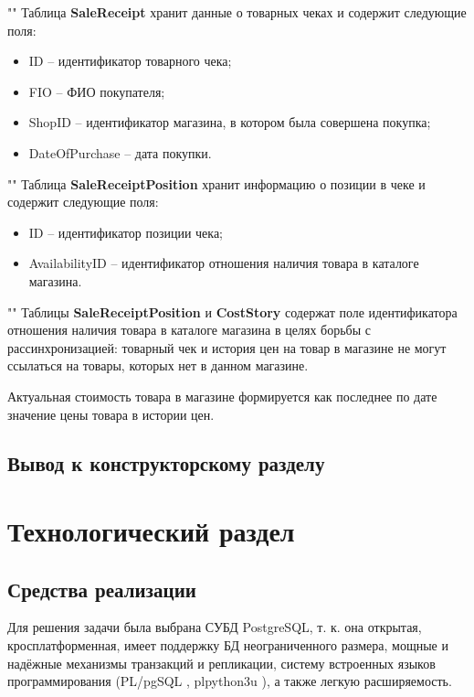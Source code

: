 \documentclass[a4paper,14pt]{extreport}
\begin{document}
""\newline\indent
Таблица \textbf{SaleReceipt} хранит данные о товарных чеках и содержит следующие поля:
\begin{itemize}
	\setlength\itemsep{0.01em}
	\item ID -- идентификатор товарного чека;
	\item FIO -- ФИО покупателя;
	\item ShopID -- идентификатор магазина, в котором была совершена покупка;
	\item DateOfPurchase -- дата покупки.
\end{itemize}

""\newline\indent
Таблица \textbf{SaleReceiptPosition} хранит информацию о позиции в чеке и содержит следующие поля:
\begin{itemize}
	\setlength\itemsep{0.01em}
	\item ID -- идентификатор позиции чека;
	\item AvailabilityID -- идентификатор отношения наличия товара в каталоге магазина.
\end{itemize}

""\newline\indent
Таблицы \textbf{SaleReceiptPosition} и \textbf{CostStory} содержат поле идентификатора отношения наличия товара в каталоге магазина в целях борьбы с рассинхронизацией: товарный чек и история цен на товар в магазине не могут ссылаться на товары, которых нет в данном магазине.

Актуальная стоимость товара в магазине формируется как последнее по дате значение цены товара в истории цен.


\section*{Вывод к конструкторскому разделу}

\chapter{Технологический раздел}

\section{Средства реализации}

Для решения задачи была выбрана СУБД PostgreSQL, т. к. она открытая, кросплатформенная, имеет поддержку БД неограниченного размера, мощные и надёжные механизмы транзакций и репликации, систему встроенных языков программирования (PL/pgSQL \cite{plpgsql}, plpython3u \cite{plpython3u}), а также легкую расширяемость.
\end{document}
